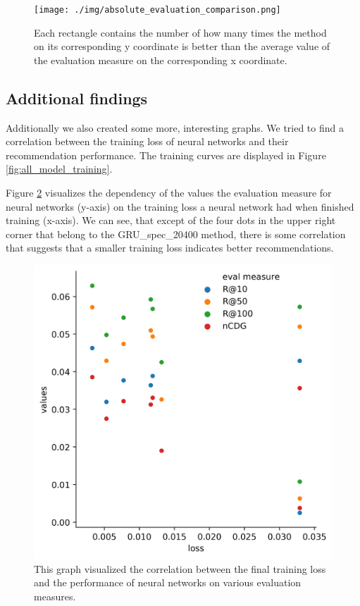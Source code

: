 \begin{figure}[h]
    \centering
	\texttt{[image: ./img/absolute\_evaluation\_comparison.png]}
	\caption{Each rectangle contains the number of how many times the method on its corresponding y coordinate is better than the average value of the evaluation measure on the corresponding x coordinate.}
	\label{fig:absolute_evaluation_comparison}
\end{figure}

\subsection{Additional findings}\label{ssec:additional findings}
Additionally we also created some more, interesting graphs. We tried to find a correlation between the training loss of neural networks and their recommendation performance. The training curves are displayed in Figure \ref{fig:all_model_training}. 

Figure \ref{fig:training_correlation_graph} visualizes the dependency of the values the evaluation measure for neural networks (y-axis) on the training loss a neural network had when finished training (x-axis). We can see, that except of the four dots in the upper right corner that belong to the GRU\_spec\_20400 method, there is some correlation that suggests that a smaller training loss indicates better recommendations.

\begin{figure}[h]
    \centering
	\includegraphics[width=1\linewidth]{./img/nn_training_performance_correlation.png}
	\caption{This graph visualized the correlation between the final training loss and the performance of neural networks on various evaluation measures.}
	\label{fig:training_correlation_graph}
\end{figure}


